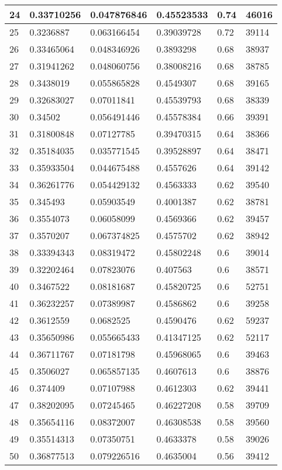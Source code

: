 \begin{longtable}{|l|l|l|l|l|l|}
24 & 0.33710256 & 0.047876846 & 0.45523533 & 0.74 & 46016 \\ \hline 
25 & 0.3236887 & 0.063166454 & 0.39039728 & 0.72 & 39114 \\ \hline 
26 & 0.33465064 & 0.048346926 & 0.3893298 & 0.68 & 38937 \\ \hline 
27 & 0.31941262 & 0.048060756 & 0.38008216 & 0.68 & 38785 \\ \hline 
28 & 0.3438019 & 0.055865828 & 0.4549307 & 0.68 & 39165 \\ \hline 
29 & 0.32683027 & 0.07011841 & 0.45539793 & 0.68 & 38339 \\ \hline 
30 & 0.34502 & 0.056491446 & 0.45578384 & 0.66 & 39391 \\ \hline 
31 & 0.31800848 & 0.07127785 & 0.39470315 & 0.64 & 38366 \\ \hline 
32 & 0.35184035 & 0.035771545 & 0.39528897 & 0.64 & 38471 \\ \hline 
33 & 0.35933504 & 0.044675488 & 0.4557626 & 0.64 & 39142 \\ \hline 
34 & 0.36261776 & 0.054429132 & 0.4563333 & 0.62 & 39540 \\ \hline 
35 & 0.345493 & 0.05903549 & 0.4001387 & 0.62 & 38781 \\ \hline 
36 & 0.3554073 & 0.06058099 & 0.4569366 & 0.62 & 39457 \\ \hline 
37 & 0.3570207 & 0.067374825 & 0.4575702 & 0.62 & 38942 \\ \hline 
38 & 0.33394343 & 0.08319472 & 0.45802248 & 0.6 & 39014 \\ \hline 
39 & 0.32202464 & 0.07823076 & 0.407563 & 0.6 & 38571 \\ \hline 
40 & 0.3467522 & 0.08181687 & 0.45820725 & 0.6 & 52751 \\ \hline 
41 & 0.36232257 & 0.07389987 & 0.4586862 & 0.6 & 39258 \\ \hline 
42 & 0.3612559 & 0.0682525 & 0.4590476 & 0.62 & 59237 \\ \hline 
43 & 0.35650986 & 0.055665433 & 0.41347125 & 0.62 & 52117 \\ \hline 
44 & 0.36711767 & 0.07181798 & 0.45968065 & 0.6 & 39463 \\ \hline 
45 & 0.3506027 & 0.065857135 & 0.4607613 & 0.6 & 38876 \\ \hline 
46 & 0.374409 & 0.07107988 & 0.4612303 & 0.62 & 39441 \\ \hline 
47 & 0.38202095 & 0.07245465 & 0.46227208 & 0.58 & 39709 \\ \hline 
48 & 0.35654116 & 0.08372007 & 0.46308538 & 0.58 & 39560 \\ \hline 
49 & 0.35514313 & 0.07350751 & 0.4633378 & 0.58 & 39026 \\ \hline 
50 & 0.36877513 & 0.079226516 & 0.4635004 & 0.56 & 39412 \\ \hline 
\end{longtable}